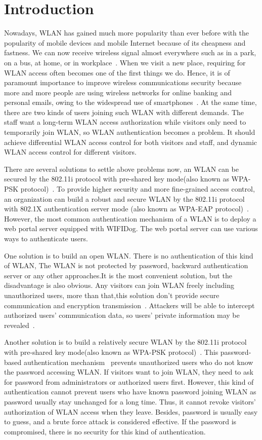 \section{Introduction}
\label{sec:Introduction}
Nowadays, WLAN has gained much more popularity than ever before with the popularity of mobile devices and mobile Internet because of its cheapness and fastness. We can now receive wireless signal almost everywhere such as in a park, on a bus, at home, or in workplace~\cite{gong2015advanced}. When we visit a new place, requiring for WLAN access often becomes one of the first things we do. Hence, it is of paramount importance to improve wireless communications security because more and more people are using wireless networks for online banking and personal emails, owing to the widespread use of smartphones~\cite{zou2016survey}. At the same time, there are two kinds of users joining such WLAN with different demands. The staff want a long-term WLAN access authorization while visitors only need to temporarily join WLAN, so  WLAN authentication becomes a problem.  It should achieve differential WLAN access control for both visitors and staff, and dynamic WLAN access control for different visitors. 


There are several solutions to settle above problems now, an  WLAN can be secured by the 802.11i protocol with pre-shared key mode(also known as WPA-PSK protocol)~\cite{Gu2011Research}. To provide higher security and more fine-grained access control, an organization can build a robust and secure  WLAN by the 802.11i protocol with 802.1X authentication server mode (also known as WPA-EAP protocol)~\cite{lashkari2009survey}. However, the most common authentication mechanism of a  WLAN is to deploy a web portal server equipped with WIFIDog. The web portal server can use various ways to authenticate users. 


One solution is to build an open WLAN. There is no authentication of this kind of WLAN, The WLAN is not protected by password, backward authentication server or any other approaches.It is the most convenient solution, but the disadvantage is also obvious. Any visitors can join WLAN freely including unauthorized users, more than that,this solution don't provide secure communication and encryption transmission~\cite{ Park2003WLAN}. Attackers will be able to intercept authorized users’ communication data, so users' private information may be revealed~\cite{Lamport1981Password}. 


Another solution is to build a relatively secure WLAN by the 802.11i protocol with pre-shared key mode(also known as WPA-PSK protocol)~\cite{macmichael2005auditing}. This password-based authentication mechanism~\cite{Burch2016Time} prevents unauthorized users who do not know the password accessing WLAN. If visitors want to join WLAN, they need to ask for password from administrators or authorized users first. However, this kind of authentication cannot prevent users who have known password joining WLAN as password usually stay unchanged for a long time. Thus, it cannot revoke visitors’ authorization of WLAN access when they leave. Besides, password is usually easy to guess, and a brute force attack is considered effective. If the password is compromised, there is no security for this kind of authentication. 


